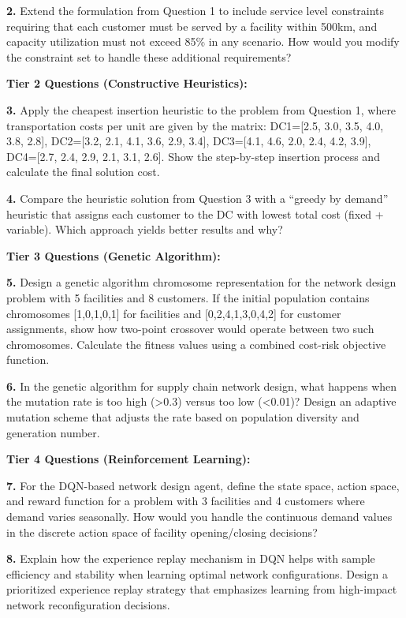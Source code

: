 \documentclass{article}
\begin{document}
\textbf{2.} Extend the formulation from Question 1 to include service level constraints requiring that each customer must be served by a facility within 500km, and capacity utilization must not exceed 85\% in any scenario. How would you modify the constraint set to handle these additional requirements?

\textbf{Tier 2 Questions (Constructive Heuristics):}

\textbf{3.} Apply the cheapest insertion heuristic to the problem from Question 1, where transportation costs per unit are given by the matrix: DC1=[2.5, 3.0, 3.5, 4.0, 3.8, 2.8], DC2=[3.2, 2.1, 4.1, 3.6, 2.9, 3.4], DC3=[4.1, 4.6, 2.0, 2.4, 4.2, 3.9], DC4=[2.7, 2.4, 2.9, 2.1, 3.1, 2.6]. Show the step-by-step insertion process and calculate the final solution cost.

\textbf{4.} Compare the heuristic solution from Question 3 with a ``greedy by demand'' heuristic that assigns each customer to the DC with lowest total cost (fixed + variable). Which approach yields better results and why?

\textbf{Tier 3 Questions (Genetic Algorithm):}

\textbf{5.} Design a genetic algorithm chromosome representation for the network design problem with 5 facilities and 8 customers. If the initial population contains chromosomes [1,0,1,0,1] for facilities and [0,2,4,1,3,0,4,2] for customer assignments, show how two-point crossover would operate between two such chromosomes. Calculate the fitness values using a combined cost-risk objective function.

\textbf{6.} In the genetic algorithm for supply chain network design, what happens when the mutation rate is too high (>0.3) versus too low (<0.01)? Design an adaptive mutation scheme that adjusts the rate based on population diversity and generation number.

\textbf{Tier 4 Questions (Reinforcement Learning):}

\textbf{7.} For the DQN-based network design agent, define the state space, action space, and reward function for a problem with 3 facilities and 4 customers where demand varies seasonally. How would you handle the continuous demand values in the discrete action space of facility opening/closing decisions?

\textbf{8.} Explain how the experience replay mechanism in DQN helps with sample efficiency and stability when learning optimal network configurations. Design a prioritized experience replay strategy that emphasizes learning from high-impact network reconfiguration decisions.
\end{document}
